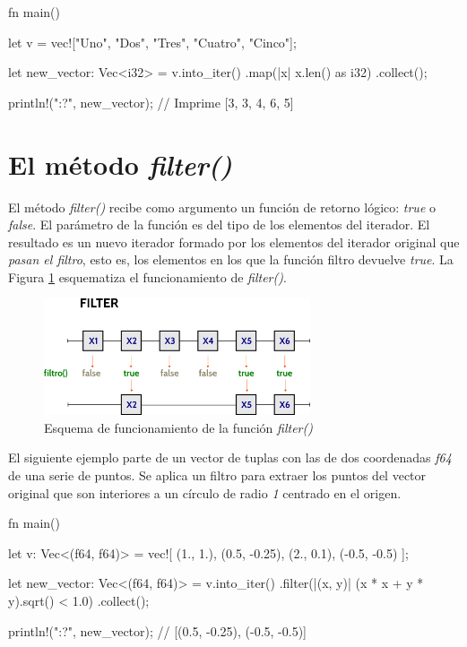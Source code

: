 \vspace{0.7em}
\begin{Codigo}
   fn main() {
      let v = vec!["Uno", "Dos", "Tres", "Cuatro", "Cinco"];
      
      let new_vector: Vec<i32> = v.into_iter()
      .map(|x| x.len() as i32)
      .collect();
      
      println!("{:?}", new_vector); // Imprime [3, 3, 4, 6, 5]
   }
\end{Codigo}

\section{El método \textit{filter()}}
\noindent El método \textit{filter()} recibe como argumento un función de retorno lógico: \textit{true} o \textit{false}. El parámetro de la función es del tipo de los elementos del iterador. El resultado es un nuevo iterador formado por los elementos del iterador original que \textit{pasan el filtro}, esto es, los elementos en los que la función filtro devuelve \textit{true}. La Figura \ref{fig_filter} esquematiza el funcionamiento de \textit{filter()}.


\begin{figure}[htb]
   \begin{center}
      \includegraphics[width=0.7\textwidth]{img/filter.png}
      \caption{Esquema de funcionamiento de la función \textit{filter()}}
      \label{fig_filter}
   \end{center}
\end{figure}

El siguiente ejemplo parte de un vector de tuplas con las de dos coordenadas \textit{f64} de una serie de puntos. Se aplica un filtro para extraer los puntos del vector original que son interiores a un círculo de radio \textit{1} centrado en el origen.

\vspace{0.7em}
\begin{Codigo}
   fn main() {
      let v: Vec<(f64, f64)> = vec![
      (1., 1.), (0.5, -0.25), 
      (2., 0.1), (-0.5, -0.5)
      ];
      
      let new_vector: Vec<(f64, f64)> = v.into_iter()
      .filter(|(x, y)| (x * x + y * y).sqrt() < 1.0)
      .collect();
      
      println!("{:?}", new_vector); // [(0.5, -0.25), (-0.5, -0.5)]
   }
\end{Codigo}

